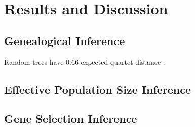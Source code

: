 \section{Results and Discussion} \label{sec:results}

\subsection{Genealogical Inference}




Random trees have 0.66 expected quartet distance \citep{smith2020information}.


\subsection{Effective Population Size Inference}





\subsection{Gene Selection Inference}



